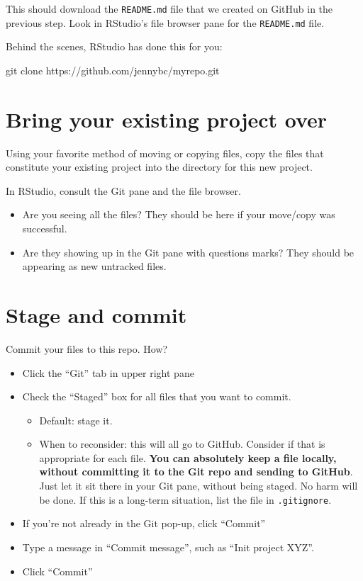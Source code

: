 \documentclass[
]{book}
\newenvironment{Shaded}{\begin{snugshade}}{\end{snugshade}}
\newcommand{\NormalTok}[1]{#1}
\providecommand{\tightlist}{%
  \setlength{\itemsep}{0pt}\setlength{\parskip}{0pt}}
\begin{document}
This should download the \texttt{README.md} file that we created on GitHub in the previous step.
Look in RStudio's file browser pane for the \texttt{README.md} file.

Behind the scenes, RStudio has done this for you:

\begin{Shaded}
\begin{Highlighting}[]
\NormalTok{git clone https://github.com/jennybc/myrepo.git}
\end{Highlighting}
\end{Shaded}

\section{Bring your existing project over}\label{bring-your-existing-project-over}

Using your favorite method of moving or copying files, copy the files that constitute your existing project into the directory for this new project.

In RStudio, consult the Git pane and the file browser.

\begin{itemize}
\tightlist
\item
  Are you seeing all the files? They should be here if your move/copy was successful.
\item
  Are they showing up in the Git pane with questions marks? They should be appearing as new untracked files.
\end{itemize}

\section{Stage and commit}\label{stage-and-commit}

Commit your files to this repo. How?

\begin{itemize}
\tightlist
\item
  Click the ``Git'' tab in upper right pane
\item
  Check the ``Staged'' box for all files that you want to commit.

  \begin{itemize}
  \tightlist
  \item
    Default: stage it.
  \item
    When to reconsider: this will all go to GitHub. Consider if that is
    appropriate for each file. \textbf{You can absolutely keep a file locally,
    without committing it to the Git repo and sending to GitHub}. Just let it
    sit there in your Git pane, without being staged. No harm will be done. If
    this is a long-term situation, list the file in \texttt{.gitignore}.
  \end{itemize}
\item
  If you're not already in the Git pop-up, click ``Commit''
\item
  Type a message in ``Commit message'', such as ``Init project XYZ''.
\item
  Click ``Commit''
\end{itemize}
\end{document}
